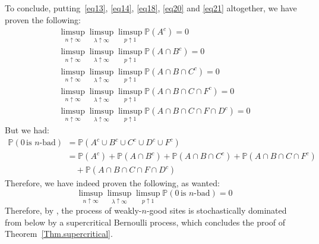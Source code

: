 \documentclass[10pt,a4paper]{amsart}
\theoremstyle{exampstyle}
\theoremstyle{exampnotations}
\begin{document}
To conclude, putting~\eqref{eq13}, \eqref{eq14}, \eqref{eq18}, \eqref{eq20} and \eqref{eq21} altogether, we have proven the following:
\begin{gather*}
    \limsup_{n \uparrow \infty}\limsup_{\lambda \uparrow \infty}\limsup_{p \uparrow 1} \mathbb{P}(A^c) = 0 
    \\  \limsup_{n \uparrow \infty}\limsup_{\lambda \uparrow \infty}\limsup_{p \uparrow 1}\mathbb{P}(A \cap B^c) = 0 
    \\  \limsup_{n \uparrow \infty}\limsup_{\lambda \uparrow \infty}\limsup_{p \uparrow 1} \mathbb{P}(A \cap B \cap C^c) = 0
  \\  \limsup_{n \uparrow \infty}\limsup_{\lambda \uparrow \infty}\limsup_{p \uparrow 1} \mathbb{P}(A \cap B \cap C \cap F^c) = 0 
  \\  \limsup_{n \uparrow \infty}\limsup_{\lambda \uparrow \infty}\limsup_{p \uparrow 1} \mathbb{P}(A \cap B \cap C \cap F \cap D^{c}) = 0
\end{gather*}
But we had:
\begin{align*}
    \mathbb{P}(0 \, \text{is $n$-bad}) &= \mathbb{P}(A^c \cup B^c \cup C^c \cup D^c \cup F^c)
\\ &= \mathbb{P}(A^c) + \mathbb{P}(A \cap B^c) + \mathbb{P}(A \cap B \cap C^c) + \mathbb{P}(A \cap B \cap C \cap F^c) \\ & \quad + \mathbb{P}(A \cap B \cap C \cap F \cap D^c)
\end{align*}
Therefore, we have indeed proven the following, as wanted:
\begin{equation*}
    \limsup_{n \uparrow \infty}\limsup_{\lambda \uparrow \infty}\limsup_{p \uparrow 1} \mathbb{P}(0 \, \text{is $n$-bad}) = 0
\end{equation*}
Therefore, by \cite[Theorem 0.0]{liggett_domination_1997}, the process of weakly-$n$-good sites is stochastically dominated from below by a supercritical Bernoulli process, which concludes the proof of Theorem~\ref{Thm.supercritical}.
\end{document}
